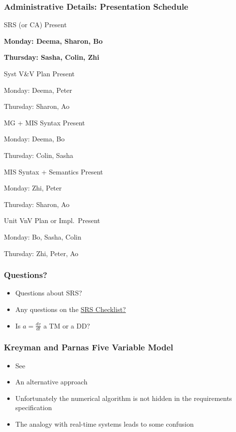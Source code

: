 \documentclass[t,12pt,numbers,fleqn]{beamer}
\begin{document}
\begin{frame}
\frametitle{Administrative Details: Presentation Schedule}

\bi
\item SRS (or CA) Present
\bi
\item \textbf{Monday: Deema, Sharon, Bo}
\item \textbf{Thursday: Sasha, Colin, Zhi}
\ei
\item Syst V\&V Plan Present
\bi
\item Monday: Deema, Peter
\item Thursday: Sharon, Ao
\ei
\item MG + MIS Syntax Present
\bi
\item Monday:  Deema, Bo
\item Thursday: Colin, Sasha
\ei
\item MIS Syntax + Semantics Present
\bi
\item Monday: Zhi, Peter
\item Thursday:  Sharon, Ao
\ei
\item Unit VnV Plan or Impl.\ Present
\bi
\item Monday: Bo, Sasha, Colin
\item Thursday: Zhi, Peter, Ao
\ei

\ei

\end{frame}


\begin{frame}
\frametitle{Questions?}
\begin{itemize}
\item Questions about SRS?
\item Any questions on the 
  \href{https://gitlab.cas.mcmaster.ca/smiths/cas741/blob/master/BlankProjectTemplate/docs/SRS/SRS-Checklist.pdf}
  {SRS Checklist?}
\item Is $a = \frac{dv}{dt}$ a TM or a DD?
\end{itemize}
\end{frame}


\begin{frame}
\frametitle{Kreyman and Parnas Five Variable Model}
\begin{itemize}
\item See \cite{KreymanAndParnas2002}
\item An alternative approach
\item Unfortunately the numerical algorithm is not hidden in the requirements specification
\item The analogy with real-time systems leads to some confusion
\end{itemize}
\end{frame}
\end{document}
